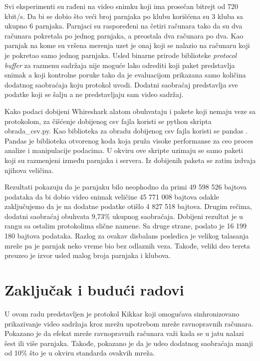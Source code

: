 \documentclass[12pt,oneside]{memoir}
\begin{document}
Svi eksperimenti su rađeni na video snimku koji ima prosečan bitrejt od 720 kbit/s. Da bi se dobio što veći broj parnjaka po klubu korišćena su 3 kluba sa ukupno 6 parnjaka. Parnjaci su raspoređeni na četiri računara tako da su dva računara pokretala po jednog parnjaka, a preostala dva računara po dva. Kao parnjak na kome su vršena merenja uzet je onaj koji se nalazio na računaru koji je pokretao samo jednog parnjaka. Usled binarne prirode biblioteke \textit{protocol buffer} za razmenu sadržaja nije moguće lako odrediti koji paket predstavlja snimak a koji kontrolne poruke tako da je evaluacijom prikazana samo količina dodatnog saobraćaja koju protokol uvodi. Dodatni saobraćaj predstavlja sve podatke koji se šalju a ne predstavljaju sam video sadržaj. 

Kako podaci dobijeni Whireshark alatom obuhvataju i pakete koji nemaju veze sa protokolom, za čišćenje dobijenog csv fajla koristi se python skripta obrada\_csv.py. Kao biblioteka za obradu dobijenog csv fajla koristi se pandas \cite{Pandas}. Pandas je biblioteka otvorenog koda koja pruža visoke performanse za ceo proces analize i manipulacije podacima. U okviru ove skripte uzimaju se samo paketi koji su razmenjeni između parnjaka i servera. Iz dobijenih paketa se zatim izdvaja njihova veličina.  

Rezultati pokazuju da je parnjaku bilo neophodno da primi 49 598 526 bajtova podataka da bi dobio video snimak veličine 45 771 008 bajtova odakle zaključujemo da je na dodatne podatke otišlo 4 827 518 bajtova. Drugim rečima, dodatni saobraćaj obuhvata 9,73\% ukupnog saobraćaja. Dobijeni rezultat je u rangu sa ostalim protokolima slične namene. Sa druge strane, poslato je 16 199 180 bajtova podataka. Razlog za ovakav disbalans posledica je velikog talasanja mreže pa je parnjak neko vreme bio bez odlaznih veza. Takođe, veliki deo tereta preuzeo je izvor usled malog broja parnjaka i klubova. 

\chapter{Zaključak i budući radovi}
\label{chp:zakljucak}

U ovom radu predstavljen je protokol Kikkar koji omogućava sinhronizovano prikazivanje video sadržaja kroz mrežu upotrebom mreže ravnopravnih računara. Pokazano je da efekat mreže ravnopravnih računara važi kada se u jatu nalazi šest ili više parnjaka. Takođe, pokazano je da je udeo dodatnog saobraćaja manji od 10\% što je u okviru standarda ovakvih mreža.
 
\end{document}
